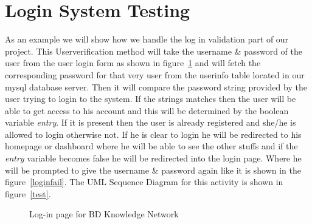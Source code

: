 \documentclass{scrreprt}
\begin{document}
\section{Login System Testing}
As an example we will show how we handle the log in validation part of our project. This Userverification  method will take the username \& password of the user from the user login form as shown in figure~\ref{login} and will fetch the corresponding password for that very user from the userinfo table located in our mysql database server. Then it will compare the password string provided by the user trying to login to the system. If the strings matches then the user will be able to get access to his account and this will be determined by the boolean variable \emph{entry}. If it is present then the user is already registered and she/he is allowed to login otherwise not. If he is clear to login he will be redirected to his homepage or dashboard where he will be able to see the other stuffs and if the \emph{entry} variable becomes false he will be redirected into the login page. Where he will be prompted to give the username \& password again like it is shown in the figure~\ref{loginfail}. The UML Sequence Diagram for this activity is shown in figure~\ref{test}.
\begin{figure}[h]
\begin{center}
\end{center} 
\caption{Log-in page for BD Knowledge Network\label{login}}
\end{figure}
\end{document}
